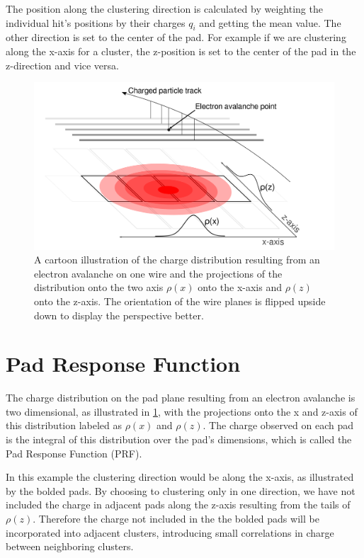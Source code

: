\documentclass[review]{elsarticle}
\begin{document}
 The position along the clustering direction is calculated by weighting the individual hit's positions by their charges $q_i$ and getting the mean value. The other direction is set to the center of the pad. For example if we are clustering along the x-axis for a cluster, the z-position is set to the center of the pad in the z-direction and vice versa. 
 


\begin{figure}[ht!]
\includegraphics[width=\linewidth]{padsat_Large}
\caption{A cartoon illustration of the charge distribution resulting from an electron avalanche on one wire and the projections of the distribution onto the two axis $\rho(x)$ onto the x-axis and $\rho(z)$ onto the z-axis. The orientation of the wire planes is flipped upside down to display the perspective better.}
\label{fig:prf}
\end{figure}

\section{Pad Response Function}
The charge distribution on the pad plane resulting from an electron avalanche is two dimensional, as illustrated in \ref{fig:prf}, with the projections onto the x and z-axis of this distribution labeled as $\rho(x)$ and $\rho(z)$. The charge observed on each pad is the integral of this distribution over the pad's dimensions, which is called the Pad Response Function (PRF).

In this example the clustering direction would be along the x-axis, as illustrated by the bolded pads. By choosing to clustering only in one direction, we have not included the charge in adjacent pads along the z-axis resulting from the tails of $\rho(z)$. Therefore the charge not included in the the bolded pads will be incorporated into adjacent clusters, introducing small correlations in charge between neighboring clusters. 
\end{document}
